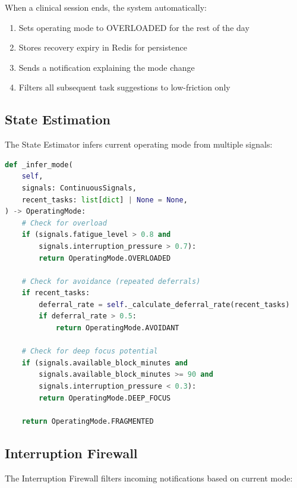 \documentclass[11pt,a4paper]{article}
\begin{document}
When a clinical session ends, the system automatically:
\begin{enumerate}
    \item Sets operating mode to OVERLOADED for the rest of the day
    \item Stores recovery expiry in Redis for persistence
    \item Sends a notification explaining the mode change
    \item Filters all subsequent task suggestions to low-friction only
\end{enumerate}

\subsection{State Estimation}

The State Estimator infers current operating mode from multiple signals:

\begin{lstlisting}[language=Python]
def _infer_mode(
    self,
    signals: ContinuousSignals,
    recent_tasks: list[dict] | None = None,
) -> OperatingMode:
    # Check for overload
    if (signals.fatigue_level > 0.8 and
        signals.interruption_pressure > 0.7):
        return OperatingMode.OVERLOADED

    # Check for avoidance (repeated deferrals)
    if recent_tasks:
        deferral_rate = self._calculate_deferral_rate(recent_tasks)
        if deferral_rate > 0.5:
            return OperatingMode.AVOIDANT

    # Check for deep focus potential
    if (signals.available_block_minutes and
        signals.available_block_minutes >= 90 and
        signals.interruption_pressure < 0.3):
        return OperatingMode.DEEP_FOCUS

    return OperatingMode.FRAGMENTED
\end{lstlisting}

\subsection{Interruption Firewall}

The Interruption Firewall filters incoming notifications based on current mode:
\end{document}
